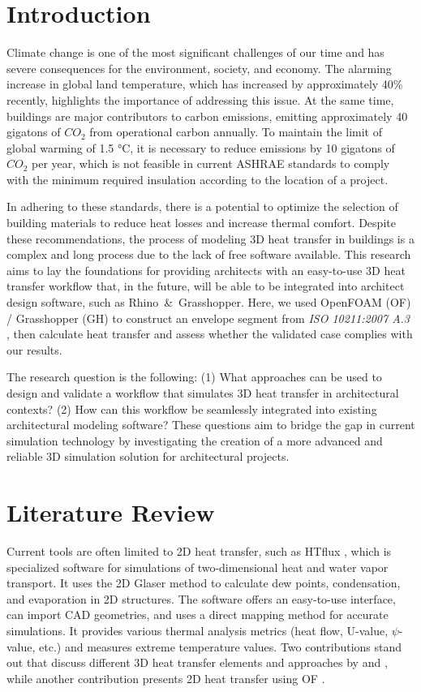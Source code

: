 \documentclass[runningheads]{llncs}
\begin{document}
\section{Introduction}
Climate change is one of the most significant challenges of our time and has severe consequences for the environment, society, and economy. The alarming increase in global land temperature, which has increased by approximately 40\% \cite{glb} recently, highlights the importance of addressing this issue. At the same time, buildings are major contributors to carbon emissions, emitting approximately 40 gigatons of $CO_2$ from operational carbon annually. To maintain the limit of global warming of 1.5 °C, it is necessary to reduce emissions by 10 gigatons of $CO_2$ per year, which is not feasible in current ASHRAE standards to comply with the minimum required insulation according to the location of a project. 

In adhering to these standards, there is a potential to optimize the selection of building materials to reduce heat losses and increase thermal comfort. Despite these recommendations, the process of modeling 3D heat transfer in buildings is a complex and long process due to the lack of free software available. This research aims to lay the foundations for providing architects with an easy-to-use 3D heat transfer workflow that, in the future, will be able to be integrated into architect design software, such as Rhino\, \&\, Grasshopper. Here, we used OpenFOAM (OF) / Grasshopper (GH) to construct an envelope segment from \textit{ISO 10211:2007 A.3}
\cite{ISO}, then calculate heat transfer and assess whether the validated case complies with our results. 

The research question is the following: (1) What approaches can be used to design and validate a workflow that simulates 3D heat transfer in architectural contexts? (2) How can this workflow be seamlessly integrated into existing architectural modeling software? These questions aim to bridge the gap in current simulation technology by investigating the creation of a more advanced and reliable 3D simulation solution for architectural projects.
\section{Literature Review}
Current tools are often limited to 2D heat transfer, such as HTflux \cite{HTflux}, which is specialized software for simulations of two-dimensional heat and water vapor transport.
It uses the 2D Glaser method \cite{glaser1959graphisches} to calculate dew points, condensation, and evaporation in 2D structures. 
The software offers an easy-to-use interface, can import CAD geometries, and uses a direct mapping method for accurate simulations. 
It provides various thermal analysis metrics (heat flow, U-value, $\psi$-value, etc.) and measures extreme temperature values. Two contributions stand out that discuss different 3D heat transfer elements and approaches by \citeauthor{Yang} \cite{Yang} and \citeauthor{COMSOL} \cite{COMSOL}, while another contribution presents 2D heat transfer using OF \cite{kastner2020solving}.
\end{document}
